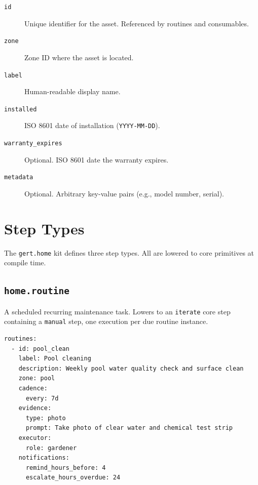 \begin{description}
  \item[\texttt{id}] Unique identifier for the asset. Referenced by routines and consumables.
  \item[\texttt{zone}] Zone ID where the asset is located.
  \item[\texttt{label}] Human-readable display name.
  \item[\texttt{installed}] ISO 8601 date of installation (\texttt{YYYY-MM-DD}).
  \item[\texttt{warranty\_expires}] Optional. ISO 8601 date the warranty expires.
  \item[\texttt{metadata}] Optional. Arbitrary key-value pairs (e.g., model number, serial).
\end{description}

\section{Step Types}
\label{sec:schema-step-types}

The \texttt{gert.home} kit defines three step types. All are lowered to core primitives at
compile time.

\subsection{\texttt{home.routine}}

A scheduled recurring maintenance task. Lowers to an \texttt{iterate} core step containing
a \texttt{manual} step, one execution per due routine instance.

\begin{verbatim}
routines:
  - id: pool_clean
    label: Pool cleaning
    description: Weekly pool water quality check and surface clean
    zone: pool
    cadence:
      every: 7d
    evidence:
      type: photo
      prompt: Take photo of clear water and chemical test strip
    executor:
      role: gardener
    notifications:
      remind_hours_before: 4
      escalate_hours_overdue: 24
\end{verbatim}

